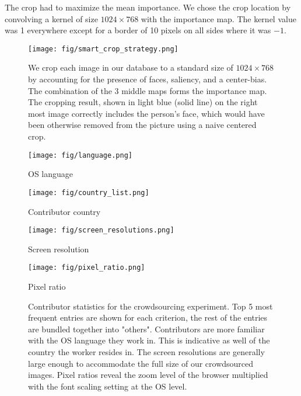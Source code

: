 \documentclass{article}
\begin{document}
The crop had to maximize the mean importance. We chose the crop location by convolving a kernel of size $1024\times768$ with the importance map. The kernel value was 1 everywhere except for a border of  10 pixels on all sides where it was $-1$. 


\begin{figure*}[!htb]
\centering
\texttt{[image: fig/smart\_crop\_strategy.png]}
\caption{We crop each image in our database to a standard size of $1024\times768$ by accounting for the presence of faces, saliency, and a center-bias. The combination of the 3 middle maps forms the importance map. The cropping result, shown in light blue (solid line) on the right most image correctly includes the person's face, which would have been otherwise removed from the picture using a naive centered crop.}
\label{fig:smart_crop}
\end{figure*}

\begin{figure*}[!ht]
\centering
\begin{minipage}{0.24\linewidth}
\centerline{\texttt{[image: fig/language.png]}}
\centerline{OS language}
\end{minipage}
\begin{minipage}{0.24\linewidth}
\centerline{\texttt{[image: fig/country\_list.png]}}
\centerline{Contributor country}
\end{minipage}
\begin{minipage}{0.24\linewidth}
\centerline{\texttt{[image: fig/screen\_resolutions.png]}}
\centerline{Screen resolution}
\end{minipage}
\begin{minipage}{0.24\linewidth}
\centerline{\texttt{[image: fig/pixel\_ratio.png]}}
\centerline{Pixel ratio}
\end{minipage}
\caption{Contributor statistics for the crowdsourcing experiment. Top 5 most frequent entries are shown for each criterion, the rest of the entries are bundled together into "others". Contributors are more familiar with the OS language they work in. This is indicative as well of the country the worker resides in. The screen resolutions are generally large enough to accommodate the full size of our crowdsourced images. Pixel ratios reveal the zoom level of the browser multiplied with the font scaling setting at the OS level.}
\label{fig:contributor-stats}
\end{figure*}
\end{document}
